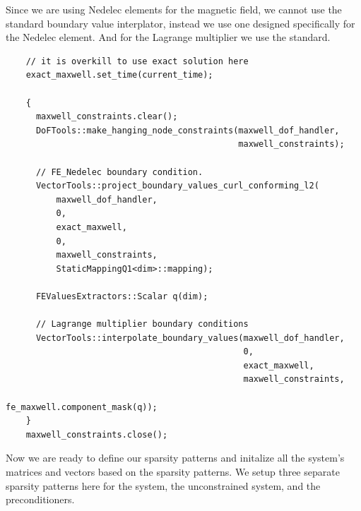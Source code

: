 \documentclass{article}
\begin{document}
Since we are using Nedelec elements for the magnetic field, we cannot use the standard boundary value interplator, instead we use one designed specifically for the Nedelec element. And for the Lagrange multiplier we use the standard.
\begin{lstlisting}
    // it is overkill to use exact solution here
    exact_maxwell.set_time(current_time);

    {
      maxwell_constraints.clear();
      DoFTools::make_hanging_node_constraints(maxwell_dof_handler,
                                              maxwell_constraints);

      // FE_Nedelec boundary condition.
      VectorTools::project_boundary_values_curl_conforming_l2(
          maxwell_dof_handler,
          0,
          exact_maxwell,
          0,
          maxwell_constraints,
          StaticMappingQ1<dim>::mapping);

      FEValuesExtractors::Scalar q(dim);

      // Lagrange multiplier boundary conditions
      VectorTools::interpolate_boundary_values(maxwell_dof_handler,
                                               0,
                                               exact_maxwell,
                                               maxwell_constraints,
                                               fe_maxwell.component_mask(q));
    }
    maxwell_constraints.close();
    \end{lstlisting}
Now we are ready to define our sparsity patterns and initalize all the system's matrices and vectors based on the sparsity patterns. We setup three separate sparsity patterns here for the system, the unconstrained system, and the preconditioners. 
\end{document}

